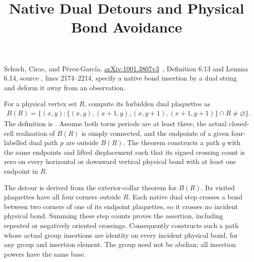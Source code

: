 \documentclass{article}
\title{Native Dual Detours and Physical Bond Avoidance}
\author{}
\date{}
\begin{document}
\maketitle
{}

Schuch, Cirac, and P\'erez-Garc\'ia,
\href{https://arxiv.org/abs/1001.3807v3}{arXiv:1001.3807v3}~\cite{Schuch2010PEPS},
Definition 6.13 and Lemma 6.14, source
, lines 2174--2214, specify a native
bond insertion by a dual string and deform it away from an observation.

For a physical vertex set $R$, compute its forbidden dual plaquettes as
\begin{align}
    B(R)=\{(x,y):\{(x,y),(x+1,y),(x,y+1),(x+1,y+1)\}\cap R\ne\varnothing\}.
    \label{eq:physical_avoidance_forbidden}
\end{align}
The definition is .
Assume both torus periods are at least three, the actual closed-cell
realization of $B(R)$ is simply connected, and the endpoints of a given
four-labelled dual path $p$ are outside $B(R)$. The theorem
constructs a path $q$ with the same endpoints and lifted displacement such
that its signed crossing count is zero on every horizontal or downward
vertical physical bond with at least one endpoint in $R$.

The detour is derived from the exterior-collar theorem for $B(R)$.
Its visited plaquettes have all four corners outside $R$. Each native dual
step crosses a bond between two corners of one of its endpoint plaquettes,
so it crosses no incident physical bond. Summing these step counts proves
the assertion, including repeated or negatively oriented crossings.
Consequently 
constructs such a path whose actual group insertions are identity on every
incident physical bond, for any group and insertion element. The group
need not be abelian; all insertion powers have the same base.
\end{document}
